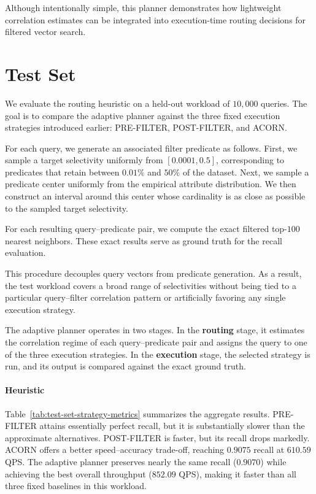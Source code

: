Although intentionally simple, this planner demonstrates how lightweight correlation estimates can be integrated into execution-time routing decisions for filtered vector search.


\section{Test Set}

We evaluate the routing heuristic on a held-out workload of \(10{,}000\)
queries. The goal is to compare the adaptive planner against the three fixed
execution strategies introduced earlier: PRE-FILTER, POST-FILTER, and ACORN.

For each query, we generate an associated filter predicate as follows. First, we
sample a target selectivity uniformly from \([0.0001, 0.5]\), corresponding to
predicates that retain between \(0.01\%\) and \(50\%\) of the dataset. Next, we
sample a predicate center uniformly from the empirical attribute distribution.
We then construct an interval around this center whose cardinality is as close
as possible to the sampled target selectivity.

For each resulting query--predicate pair, we compute the exact filtered
top-\(100\) nearest neighbors. These exact results serve as ground truth for
the recall evaluation.

This procedure decouples query vectors from predicate generation. As a result,
the test workload covers a broad range of selectivities without being tied to a
particular query--filter correlation pattern or artificially favoring any single
execution strategy.

The adaptive planner operates in two stages. In the \textbf{routing} stage, it estimates the correlation regime of each query--predicate pair and assigns the query to one of the three execution strategies. In the \textbf{execution} stage, the selected strategy is run, and its output is compared against the exact ground truth.

\paragraph{Heuristic}

Table~\ref{tab:test-set-strategy-metrics} summarizes the aggregate results. PRE-FILTER attains essentially perfect recall, but it is substantially slower than the approximate alternatives. POST-FILTER is faster, but its recall drops markedly. ACORN offers a better speed--accuracy trade-off, reaching \(0.9075\) recall at \(610.59\) QPS. The adaptive planner preserves nearly the same recall (\(0.9070\)) while achieving the best overall throughput (\(852.09\) QPS), making it faster than all three fixed baselines in this workload.

